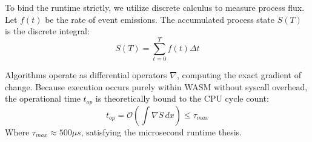 To bind the runtime strictly, we utilize discrete calculus to measure process flux. Let $f(t)$ be the rate of event emissions. The accumulated process state $S(T)$ is the discrete integral:
\[ S(T) = \sum_{t=0}^{T} f(t) \Delta t \]

Algorithms operate as differential operators $\nabla$, computing the exact gradient of change. Because execution occurs purely within WASM without syscall overhead, the operational time $t_{op}$ is theoretically bound to the CPU cycle count:
\[ t_{op} = \mathcal{O}\left( \int \nabla S \, dx \right) \le \tau_{max} \]
Where $\tau_{max} \approx 500 \mu s$, satisfying the microsecond runtime thesis.
